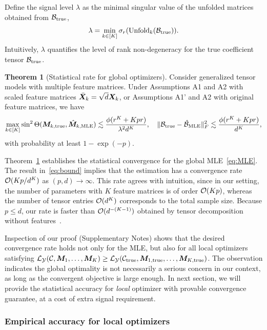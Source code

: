 \documentclass[12pt]{article}
\theoremstyle{definition}
\newtheorem{thm}{Theorem}[section]
\theoremstyle{definition}
\begin{document}
Define the signal level $\lambda$ as the minimal singular value of the unfolded matrices obtained from $\mathcal{B}_{\textup{true}}$,  
\[
\lambda=\min_{k\in[K]}\sigma_{r}(\text{Unfold}_k(\mathcal{B}_{\text{true}})).
\]
Intuitively, $\lambda$ quantifies the level of rank non-degeneracy for the true coefficient tensor $\mathcal{B}_{\textup{true}}$. 

\begin{thm}[Statistical rate for global optimizers]\label{thm:MLE}Consider generalized tensor models with multiple feature matrices. Under Assumptions A1 and A2 with scaled feature matrices $\bar {\bm X}_k= \sqrt{d}\bm X_k$, or Assumptions A1' and A2 with original feature matrices, we have
\begin{equation}\label{eq:bound}
\max_{k\in[K]}\sin^2\Theta(\bm M_{k,\textup{true}}, \hat {\bm M}_{k,\text{MLE}})\lesssim {\phi (r^K+Kpr)\over \lambda^2 d^K}, \quad \lVert\mathcal{B}_{\text{true}}-\hat {\mathcal{B}}_{\text{MLE}} \rVert_F^2\lesssim {\phi (r^K+Kpr) \over d^K},
\end{equation}
with probability at least $1-\exp(-p)$.
\end{thm}
Theorem~\ref{thm:MLE} establishes the statistical convergence for the global MLE~\eqref{eq:MLE}. The result in~\eqref{eq:bound} implies that the estimation has a convergence rate $\mathcal{O}(Kp/d^{K})$ as $(p,d)\to \infty$. {  This rate agrees with intuition, since in our setting, the number of parameters with $K$ feature matrices is of order $\mathcal{O}(Kp)$, whereas the number of tensor entries $\mathcal{O}(d^K)$ corresponds to the total sample size. Because $p\leq d$, our rate is faster than $\mathcal{O}(d^{-(K-1)})$ obtained by tensor decomposition without features~\citep{wang2020learning}.} 

Inspection of our proof (Supplementary Notes) shows that the desired convergence rate holds not only for the MLE, but also for all local optimizers satisfying $\mathcal{L}_{\mathcal{Y}}(\mathcal{C}, \bm M_1,\ldots,\bm M_K)\geq \mathcal{L}_{\mathcal{Y}} (\mathcal{C}_{\textup{true}},\bm M_{1,\textup{true}},\ldots,\bm M_{K,\textup{true}})$. The observation indicates the global optimality is not necessarily a serious concern in our context, as long as the convergent objective is large enough. In next section, we will provide the statistical accuracy for \emph{local} optimizer with provable convergence guarantee, at a cost of extra signal requirement. 



\subsubsection{Empirical accuracy for local optimizers}\label{sec:local}
\end{document}
